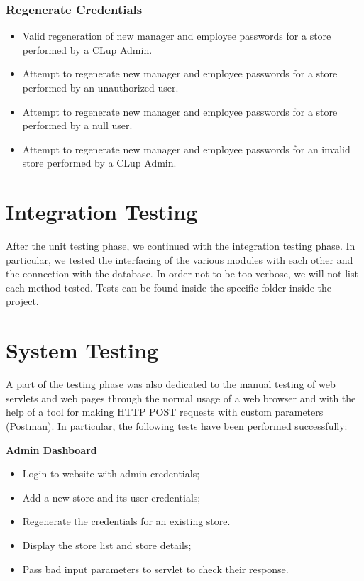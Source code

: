 \subsubsection{Regenerate Credentials}
\begin{itemize}
	\item Valid regeneration of new manager and employee passwords for a store performed by a CLup Admin.
	\item Attempt to regenerate new manager and employee passwords for a store performed by an unauthorized user.
	\item Attempt to regenerate new manager and employee passwords for a store performed by a null user.
	\item Attempt to regenerate new manager and employee passwords for an invalid store performed by a CLup Admin.
\end{itemize}

\section{Integration Testing}
After the unit testing phase, we continued with the integration testing phase. In particular, we tested the interfacing of the various modules with each other and the connection with the database.
In order not to be too verbose, we will not list each method tested. Tests can be found inside the specific folder inside the project.

\section{System Testing}
A part of the testing phase was also dedicated to the manual testing of web servlets and web pages through the normal usage of a web browser and with the help of a tool for making HTTP POST requests with custom parameters (Postman).
In particular, the following tests have been performed successfully:

\textbf{Admin Dashboard}
\begin{itemize}
	\item Login to website with admin credentials;
	\item Add a new store and its user credentials;
	\item Regenerate the credentials for an existing store.
	\item Display the store list and store details;
	\item Pass bad input parameters to servlet to check their response.
\end{itemize}

